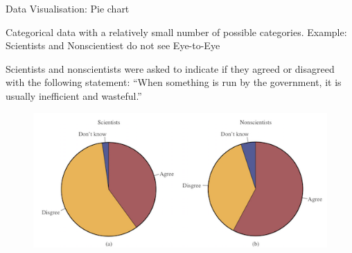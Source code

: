 \documentclass[ignorenonframetext,]{beamer}
\begin{document}
\begin{frame}{Data Visualisation: Pie chart}

Categorical data with a relatively small number of possible categories.
Example: Scientists and Nonscientiest do not see Eye-to-Eye

Scientists and nonscientists were asked to indicate if they agreed or
disagreed with the following statement: ``When something is run by the
government, it is usually inefficient and wasteful.''

\begin{figure}
\centering
\includegraphics{fig1.6.png}
\caption{}
\end{figure}

\end{frame}
\end{document}
